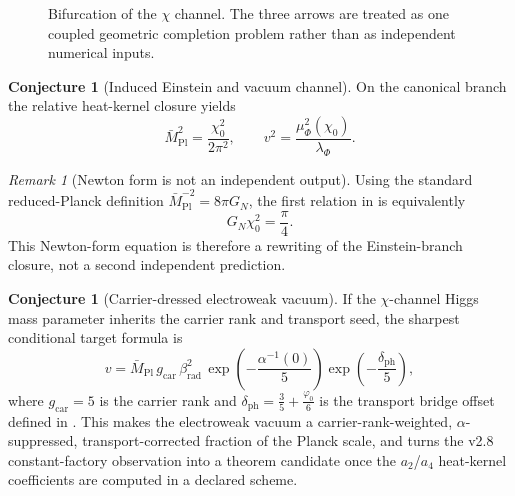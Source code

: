 \documentclass[11pt,a4paper]{article}
\theoremstyle{definition}
\newtheorem{conjecture}[theorem]{Conjecture}
\theoremstyle{remark}
\newtheorem*{remark}{Remark}
\newcommand{\Mpl}{\bar M_{\mathrm{Pl}}}
\newcommand{\phiz}{\varphi_0}
\newcommand{\gcar}{g_{\mathrm{car}}}
\begin{document}
\begin{figure}[t]
\centering
{}
\caption{Bifurcation of the $\chi$ channel. The three arrows are treated as one coupled geometric completion problem rather than as independent numerical inputs.}
\label{fig:chi-bifurcation}
\end{figure}

\begin{conjecture}[Induced Einstein and vacuum channel]
On the canonical branch the relative heat-kernel closure yields
\begin{equation}
\label{eq:induced-einstein}
\Mpl^2=\frac{\chi_0^2}{2\pi^2},
\qquad
v^2=\frac{\mu_\Phi^2(\chi_0)}{\lambda_\Phi}.
\end{equation}
\end{conjecture}

\begin{remark}[Newton form is not an independent output]
Using the standard reduced-Planck definition $\Mpl^{-2}=8\pi G_N$, the first relation in  is equivalently
\[
G_N\chi_0^2=\frac{\pi}{4}.
\]
This Newton-form equation is therefore a rewriting of the Einstein-branch closure, not a second independent prediction.
\end{remark}

\begin{conjecture}[Carrier-dressed electroweak vacuum]
If the $\chi$-channel Higgs mass parameter inherits the carrier rank and transport seed, the sharpest conditional target formula is
\begin{equation}
\label{eq:carrier-dressed-v}
v
=
\Mpl\,\gcar\,\beta_{\mathrm{rad}}^2\,
\exp\!\left(-\frac{\alpha^{-1}(0)}{5}\right)
\exp\!\left(-\frac{\delta_{\mathrm{ph}}}{5}\right),
\end{equation}
where $\gcar=5$ is the carrier rank and $\delta_{\mathrm{ph}}=\frac35+\frac{\phiz}{6}$ is the transport bridge offset defined in . This makes the electroweak vacuum a carrier-rank-weighted, $\alpha$-suppressed, transport-corrected fraction of the Planck scale, and turns the v2.8 constant-factory observation into a theorem candidate once the $a_2$/$a_4$ heat-kernel coefficients are computed in a declared scheme.
\end{conjecture}
\end{document}
